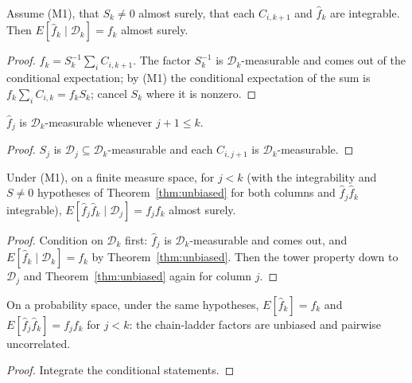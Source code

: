 \begin{theorem}\label{thm:unbiased}\leanok
{}
Assume (M1), that $S_k \neq 0$ almost surely, that each $C_{i,k+1}$ and $\hat f_k$ are
integrable. Then $E[\hat f_k \mid \mathcal{D}_k] = f_k$ almost surely.
\end{theorem}
\begin{proof}\leanok
$\hat f_k = S_k^{-1} \sum_i C_{i,k+1}$. The factor $S_k^{-1}$ is $\mathcal{D}_k$-measurable and
comes out of the conditional expectation; by (M1) the conditional expectation of the sum is
$f_k \sum_i C_{i,k} = f_k S_k$; cancel $S_k$ where it is nonzero.
\end{proof}

\begin{lemma}\label{lem:fhat_meas}\leanok
{}
$\hat f_j$ is $\mathcal{D}_k$-measurable whenever $j + 1 \le k$.
\end{lemma}
\begin{proof}\leanok $S_j$ is $\mathcal{D}_j \subseteq \mathcal{D}_k$-measurable and each $C_{i,j+1}$ is $\mathcal{D}_k$-measurable. \end{proof}

\begin{theorem}\label{thm:uncorrelated}\leanok
{}
Under (M1), on a finite measure space, for $j < k$ (with the integrability and $S \neq 0$
hypotheses of Theorem~\ref{thm:unbiased} for both columns and $\hat f_j \hat f_k$ integrable),
$E[\hat f_j \hat f_k \mid \mathcal{D}_j] = f_j f_k$ almost surely.
\end{theorem}
\begin{proof}\leanok
Condition on $\mathcal{D}_k$ first: $\hat f_j$ is $\mathcal{D}_k$-measurable and comes out, and
$E[\hat f_k \mid \mathcal{D}_k] = f_k$ by Theorem~\ref{thm:unbiased}. Then the tower property
down to $\mathcal{D}_j$ and Theorem~\ref{thm:unbiased} again for column $j$.
\end{proof}

\begin{theorem}\label{thm:mack2}\leanok
{}
On a probability space, under the same hypotheses, $E[\hat f_k] = f_k$ and
$E[\hat f_j \hat f_k] = f_j f_k$ for $j < k$: the chain-ladder factors are unbiased and
pairwise uncorrelated.
\end{theorem}
\begin{proof}\leanok Integrate the conditional statements. \end{proof}


